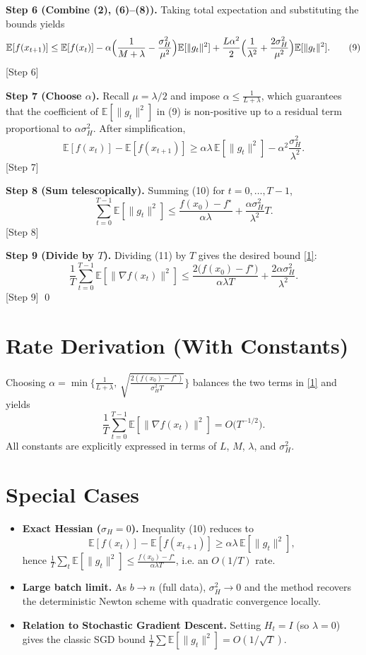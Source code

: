 \documentclass{article}
\newcommand{\E}{\mathbb{E}}
\begin{document}
\noindent\textbf{Step 6 (Combine (2), (6)–(8)).}  
Taking total expectation and substituting the bounds yields
\[
\E[f(x_{t+1})]\le \E[f(x_{t})]
-\alpha\Bigl(\frac{1}{M+\lambda}-\frac{\sigma_{H}^{2}}{\mu^{2}}\Bigr)\E[\|g_{t}\|^{2}]
+\frac{L\alpha^{2}}{2}\Bigl(\frac{1}{\lambda^{2}}+\frac{2\sigma_{H}^{2}}{\mu^{2}}\Bigr)\E[\|g_{t}\|^{2}].
\tag{9}
\]
[Step 6]

\noindent\textbf{Step 7 (Choose $\alpha$).}  
Recall $\mu=\lambda/2$ and impose $\alpha\le\frac{1}{L+\lambda}$, which guarantees that the coefficient of $\E[\|g_{t}\|^{2}]$ in (9) is non‑positive up to a residual term proportional to $\alpha\sigma_{H}^{2}$. After simplification,
\[
\E[f(x_{t})]-\E[f(x_{t+1})]\ge
\alpha\lambda\,\E[\|g_{t}\|^{2}] - \alpha^{2}\frac{\sigma_{H}^{2}}{\lambda^{2}}.
\tag{10}
\]
[Step 7]

\noindent\textbf{Step 8 (Sum telescopically).}  
Summing (10) for $t=0,\dots,T-1$,
\[
\sum_{t=0}^{T-1}\E[\|g_{t}\|^{2}]
\le
\frac{f(x_{0})-f^{\star}}{\alpha\lambda}
+\frac{\alpha\sigma_{H}^{2}}{\lambda^{2}}T.
\tag{11}
\]
[Step 8]

\noindent\textbf{Step 9 (Divide by $T$).}  
Dividing (11) by $T$ gives the desired bound \eqref{1}:
\[
\frac{1}{T}\sum_{t=0}^{T-1}\E[\|\nabla f(x_{t})\|^{2}]
\le
\frac{2\bigl(f(x_{0})-f^{\star}\bigr)}{\alpha\lambda T}
+\frac{2\alpha\sigma_{H}^{2}}{\lambda^{2}}.
\]
[Step 9] \qed

\section*{Rate Derivation (With Constants)}
Choosing $\alpha = \min\bigl\{ \frac{1}{L+\lambda},\,\sqrt{\frac{2(f(x_{0})-f^{\star})}{\sigma_{H}^{2}T}}\bigr\}$ balances the two terms in \eqref{1} and yields
\[
\frac{1}{T}\sum_{t=0}^{T-1}\E[\|\nabla f(x_{t})\|^{2}]
= O\!\bigl(T^{-1/2}\bigr).
\]
All constants are explicitly expressed in terms of $L$, $M$, $\lambda$, and $\sigma_{H}^{2}$.

\section*{Special Cases}
\begin{itemize}[leftmargin=*]
\item \textbf{Exact Hessian ($\sigma_{H}=0$).} Inequality (10) reduces to
\[
\E[f(x_{t})]-\E[f(x_{t+1})]\ge \alpha\lambda\,\E[\|g_{t}\|^{2}],
\]
hence $\frac{1}{T}\sum_{t}\E[\|g_{t}\|^{2}]\le \frac{f(x_{0})-f^{\star}}{\alpha\lambda T}$, i.e. an $O(1/T)$ rate.
\item \textbf{Large batch limit.} As $b\to n$ (full data), $\sigma_{H}^{2}\to 0$ and the method recovers the deterministic Newton scheme with quadratic convergence locally.
\item \textbf{Relation to Stochastic Gradient Descent.} Setting $H_{t}=I$ (so $\lambda=0$) gives the classic SGD bound $\frac{1}{T}\sum\E[\|g_{t}\|^{2}] = O(1/\sqrt{T})$.
\end{itemize}
\end{document}
